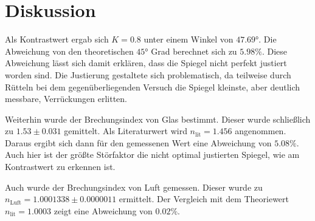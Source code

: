 \section{Diskussion}
\label{sec:Diskussion}
Als Kontrastwert ergab sich $K = 0.8$ unter einem Winkel von $47.69°$.
Die Abweichung von den theoretischen $45°$ Grad berechnet sich zu $5.98 \% $.
Diese Abweichung lässt sich damit erklären, dass die Spiegel nicht perfekt justiert worden sind.
Die Justierung gestaltete sich problematisch, da teilweise durch Rütteln bei dem gegenüberliegenden Versuch die Spiegel kleinste, aber deutlich messbare, Verrückungen erlitten.

Weiterhin wurde der Brechungsindex von Glas bestimmt.
Dieser wurde schließlich zu $1.53 \pm 0.031$ gemittelt.
Als Literaturwert wird $n_\text{lit} = 1.456$ angenommen.
Daraus ergibt sich dann für den gemessenen Wert eine Abweichung von $5.08 \%$.
Auch hier ist der größte Störfaktor die nicht optimal justierten Spiegel, wie am Kontrastwert zu erkennen ist.

Auch wurde der Brechungsindex von Luft gemessen.
Dieser wurde zu $n_\text{Luft} = 1.0001338 \pm 0.0000011$ ermittelt.
Der Vergleich mit dem Theoriewert $n_\text{lit} = 1.0003$ zeigt eine Abweichung von $0.02 \%$.